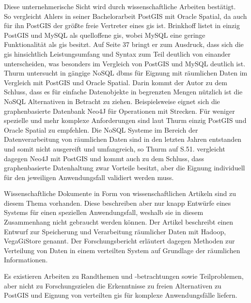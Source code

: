 Diese unternehmerische Sicht wird durch wissenschaftliche Arbeiten bestätigt.\\
So vergleicht Ahlers in seiner Bachelorarbeit \cite{ba:pgvsoracle} PostGIS mit Oracle Spatial, da auch für ihn PostGIS der größte freie Vertreter eines \Gls{gis} ist.
Brinkhoff listet in \cite[S.36]{book:prawirtinf} einzig PostGIS und MySQL als quelloffene \Gls{gis}, wobei MySQL eine geringe Funktionalität als \Gls{gis} besitzt.
Auf Seite 37 bringt er zum Ausdruck, dass sich die \Gls{gis} hinsichtlich Leistungsumfang und Syntax zum Teil deutlich von einander unterscheiden, was besonders im Vergleich von PostGIS und MySQL deutlich ist.
Thurm untersucht in \cite{ba:nosqlfuergeodaten} gängige NoSQL \Gls{dbms} für Eignung mit räumlichen Daten im Vergleich mit PostGIS und Oracle Spatial.
Darin kommt der Autor zu dem Schluss, dass es für einfache Datenobjekte in begrenzten Mengen nützlich ist die NoSQL Alternativen in Betracht zu ziehen.
Beispielsweise eignet sich die graphenbasierte Datenbank Neo4J für Operationen mit Strecken.
Für weniger spezielle und mehr komplexe Anforderungen sind laut Thurm einzig PostGIS und Oracle Spatial zu empfehlen.
Die NoSQL Systeme im Bereich der Datenverarbeitung von räumlichen Daten sind in den letzten Jahren entstanden und somit nicht ausgereift und umfangreich, so Thurm auf S.51.
\cite{ma:neo4j} vergleicht dagegen Neo4J mit PostGIS und kommt auch zu dem Schluss, dass graphenbasierte Datenhaltung zwar Vorteile besitzt, aber die Eignung individuell für den jeweiligen Anwendungsfall validiert werden muss.

Wissenschaftliche Dokumente in Form von wissenschaftlichen Artikeln sind zu diesem Thema vorhanden.
Diese beschreiben aber nur knapp Entwürfe eines Systems für einen speziellen Anwendungsfall, weshalb sie in diesem Zusammenhang nicht gebraucht werden können.
Der Artikel \cite{paper:hdfsspatial} beschreibt einen Entwurf zur Speicherung und Verarbeitung räumlicher Daten mit Hadoop, VegaGiStore genannt.
Der Forschungsbericht \cite{paper:spatialdistribution} erläutert dagegen Methoden zur Verteilung von Daten in einem verteilten System auf Grundlage der räumlichen Informationen.

Es existieren Arbeiten zu Randthemen und -betrachtungen sowie Teilproblemen, aber nicht zu Forschungszielen die Erkenntnisse zu freien Alternativen zu PostGIS und Eignung von verteilten \Gls{gis} für komplexe Anwendungsfälle liefern.

